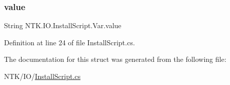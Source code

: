 \subsubsection{\texorpdfstring{value}{value}}
{\footnotesize\ttfamily String N\+T\+K.\+I\+O.\+Install\+Script.\+Var.\+value}



Definition at line 24 of file Install\+Script.\+cs.



The documentation for this struct was generated from the following file\+:\begin{DoxyCompactItemize}
\item 
N\+T\+K/\+I\+O/\mbox{\hyperlink{_install_script_8cs}{Install\+Script.\+cs}}\end{DoxyCompactItemize}
